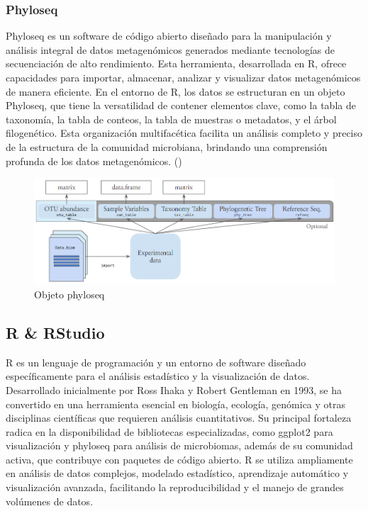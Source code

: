 \subsubsection{Phyloseq}
Phyloseq es un software de código abierto diseñado para la manipulación y análisis integral de datos metagenómicos generados mediante tecnologías de secuenciación de alto rendimiento. Esta herramienta, desarrollada en R, ofrece capacidades para importar, almacenar, analizar y visualizar datos metagenómicos de manera eficiente. En el entorno de R, los datos se estructuran en un objeto Phyloseq, que tiene la versatilidad de contener elementos clave, como la tabla de taxonomía, la tabla de conteos, la tabla de muestras o metadatos, y el árbol filogenético. Esta organización multifacética facilita un análisis completo y preciso de la estructura de la comunidad microbiana, brindando una comprensión profunda de los datos metagenómicos. (\cite{mcmurdie2013})\\

\begin{figure}[h]
\centering
\includegraphics[width=\textwidth]{Img/cap2/Phyloseq.png}
\caption{Objeto phyloseq }%
\end{figure}

\subsection{R \& RStudio}
R es un lenguaje de programación y un entorno de software diseñado específicamente para el análisis estadístico y la visualización de datos. Desarrollado inicialmente por Ross Ihaka y Robert Gentleman en 1993, se ha convertido en una herramienta esencial en biología, ecología, genómica y otras disciplinas científicas que requieren análisis cuantitativos. Su principal fortaleza radica en la disponibilidad de bibliotecas especializadas, como ggplot2 para visualización y phyloseq para análisis de microbiomas, además de su comunidad activa, que contribuye con paquetes de código abierto. R se utiliza ampliamente en análisis de datos complejos, modelado estadístico, aprendizaje automático y visualización avanzada, facilitando la reproducibilidad y el manejo de grandes volúmenes de datos.\\

